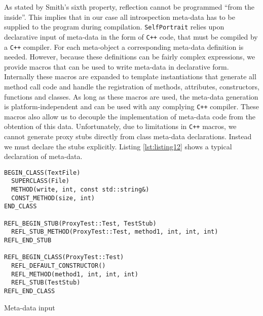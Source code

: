As stated by Smith's \cite{Smith} sixth property, reflection cannot be programmed ``from the inside''. This implies that
in our case all introspection meta-data has to be supplied to the program during compilation. \texttt{SelfPortrait}
relies upon declarative input of meta-data in the form of \texttt{C++} code, that must be compiled by a \texttt{C++} compiler.
For each meta-object a corresponding meta-data definition is needed. However, because these definitions can be fairly
complex expressions, we provide macros that can be used to write meta-data in declarative form.
Internally these macros are expanded to template instantiations that generate all method
call code and handle the registration of methods, attributes, constructors, functions and classes. As long
as these macros are used, the meta-data generation is platform-independent and can be used with any complying
\texttt{C++} compiler. These macros also allow us to decouple the implementation of meta-data code from the obtention
of this data. Unfortunately, due to limitations in \texttt{C++} macros, we cannot generate proxy stubs directly from class 
meta-data declarations. Instead we must declare the stubs explicitly. Listing \ref{lst:listing12} shows a typical
declaration of meta-data.

\begin{listing}[H]
\begin{verbatim}
BEGIN_CLASS(TextFile)
  SUPERCLASS(File)
  METHOD(write, int, const std::string&)
  CONST_METHOD(size, int)
END_CLASS

REFL_BEGIN_STUB(ProxyTest::Test, TestStub)
  REFL_STUB_METHOD(ProxyTest::Test, method1, int, int, int)
REFL_END_STUB

REFL_BEGIN_CLASS(ProxyTest::Test)
  REFL_DEFAULT_CONSTRUCTOR()
  REFL_METHOD(method1, int, int, int)
  REFL_STUB(TestStub)
REFL_END_CLASS
\end{verbatim}
\caption{Meta-data input}
\label{lst:listing12}
\end{listing}

